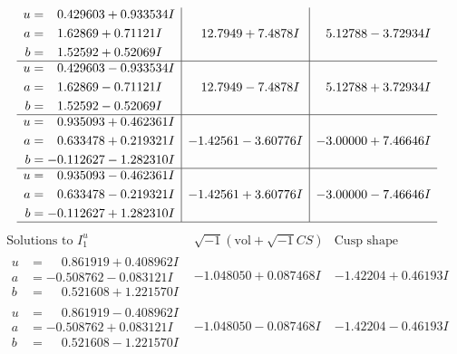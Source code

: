 \documentclass[1p]{elsarticle_modified}
\theoremstyle{definition}
\newcommand{\I}{\sqrt{-1}}
\begin{document}
$$\begin{array}{c|c|c}
\begin{aligned}
u &= \phantom{-}0.429603 + 0.933534 I \\
a &= \phantom{-}1.62869 + 0.71121 I \\
b &= \phantom{-}1.52592 + 0.52069 I\end{aligned}
 & \phantom{-}12.7949 + 7.4878 I & \phantom{-}5.12788 - 3.72934 I \\ \hline\begin{aligned}
u &= \phantom{-}0.429603 - 0.933534 I \\
a &= \phantom{-}1.62869 - 0.71121 I \\
b &= \phantom{-}1.52592 - 0.52069 I\end{aligned}
 & \phantom{-}12.7949 - 7.4878 I & \phantom{-}5.12788 + 3.72934 I \\ \hline\begin{aligned}
u &= \phantom{-}0.935093 + 0.462361 I \\
a &= \phantom{-}0.633478 + 0.219321 I \\
b &= -0.112627 - 1.282310 I\end{aligned}
 & -1.42561 - 3.60776 I & -3.00000 + 7.46646 I \\ \hline\begin{aligned}
u &= \phantom{-}0.935093 - 0.462361 I \\
a &= \phantom{-}0.633478 - 0.219321 I \\
b &= -0.112627 + 1.282310 I\end{aligned}
 & -1.42561 + 3.60776 I & -3.00000 - 7.46646 I\\
 \hline 
 \end{array}$$\newpage$$\begin{array}{c|c|c}  
\text{Solutions to }I^u_{1}& \I (\text{vol} + \sqrt{-1}CS) & \text{Cusp shape}\\
 \hline 
\begin{aligned}
u &= \phantom{-}0.861919 + 0.408962 I \\
a &= -0.508762 - 0.083121 I \\
b &= \phantom{-}0.521608 + 1.221570 I\end{aligned}
 & -1.048050 + 0.087468 I & -1.42204 + 0.46193 I \\ \hline\begin{aligned}
u &= \phantom{-}0.861919 - 0.408962 I \\
a &= -0.508762 + 0.083121 I \\
b &= \phantom{-}0.521608 - 1.221570 I\end{aligned}
 & -1.048050 - 0.087468 I & -1.42204 - 0.46193 I \\ \hline\begin{aligned}

\end{aligned}
\end{array}$$
\end{document}
